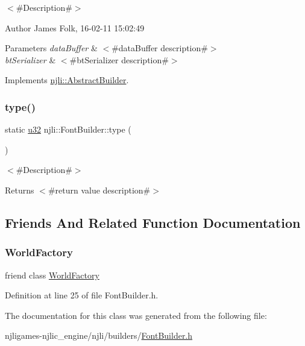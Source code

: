 $<$\#\+Description\#$>$ 

\begin{DoxyAuthor}{Author}
James Folk, 16-\/02-\/11 15\+:02\+:49
\end{DoxyAuthor}

\begin{DoxyParams}{Parameters}
{\em data\+Buffer} & $<$\#data\+Buffer description\#$>$ \\
\hline
{\em bt\+Serializer} & $<$\#bt\+Serializer description\#$>$ \\
\hline
\end{DoxyParams}


Implements \mbox{\hyperlink{classnjli_1_1_abstract_builder_ab66b774e02ccb9da554c9aab7fa6d981}{njli\+::\+Abstract\+Builder}}.

\mbox{\label{classnjli_1_1_font_builder_a4385a3b8e3ca2e1d42422221692c461a}} 
\subsubsection{\texorpdfstring{type()}{type()}}
{\footnotesize\ttfamily static \mbox{\hyperlink{_util_8h_a10e94b422ef0c20dcdec20d31a1f5049}{u32}} njli\+::\+Font\+Builder\+::type (\begin{DoxyParamCaption}{ }\end{DoxyParamCaption})\hspace{0.3cm}{\ttfamily [static]}}

$<$\#\+Description\#$>$

\begin{DoxyReturn}{Returns}
$<$\#return value description\#$>$ 
\end{DoxyReturn}


\subsection{Friends And Related Function Documentation}
\mbox{\label{classnjli_1_1_font_builder_acb96ebb09abe8f2a37a915a842babfac}} 
\subsubsection{\texorpdfstring{World\+Factory}{WorldFactory}}
{\footnotesize\ttfamily friend class \mbox{\hyperlink{classnjli_1_1_world_factory}{World\+Factory}}\hspace{0.3cm}{\ttfamily [friend]}}



Definition at line 25 of file Font\+Builder.\+h.



The documentation for this class was generated from the following file\+:\begin{DoxyCompactItemize}
\item 
njligames-\/njlic\+\_\+engine/njli/builders/\mbox{\hyperlink{_font_builder_8h}{Font\+Builder.\+h}}\end{DoxyCompactItemize}
